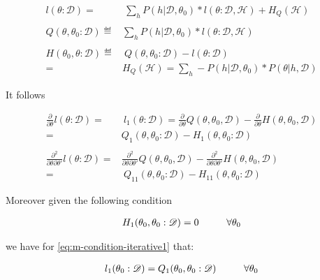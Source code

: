 \documentclass[11pt]{article}
\begin{document}
\begin{align} \label{eq:likelihood_energy_iterative}
l (\theta: \mathscr{D}) =& \  \sum_h P(h | \mathscr{D}, \theta_0) * l (\theta: \mathscr{D}, \mathscr{H}) + H_Q (\mathscr {H}) \\
\nonumber\\
Q(\theta, \theta_0 : \mathscr{D}) \eqdef& \sum_h P(h | \mathscr{D}, \theta_0) * l (\theta: \mathscr{D}, \mathscr{H})\\
\nonumber\\  
H(\theta_0, \theta: \mathscr{D}) \eqdef& \ Q(\theta, \theta_0 : \mathscr{D}) - l (\theta: \mathscr{D}) \\
                                 =& H_Q (\mathscr {H}) = \sum_h - P(h | \mathscr{D}, \theta_0) * P(\theta | h, \mathscr{D}) \nonumber
\end{align}

It follows

\begin{align} 
\frac{\partial}{\partial \theta} l (\theta: \mathscr{D}) =& \ l_1 (\theta: \mathscr{D}) = \frac{\partial}{\partial \theta} Q(\theta, \theta_0, \mathscr{D}) - \frac{\partial}{\partial \theta} H(\theta, \theta_0, \mathscr{D}) \nonumber \\
=& Q_1(\theta, \theta_0 : \mathscr{D}) - H_1(\theta, \theta_0 : \mathscr{D})  \label{eq:m-condition-iterative1} \\
\nonumber \\
\frac{\partial^2}{\partial \theta \partial \theta'} l (\theta: \mathscr{D}) =& \frac{\partial^2}{\partial \theta \partial \theta'}  Q(\theta, \theta_0, \mathscr{D}) -  \frac{\partial^2}{\partial \theta \partial \theta'}  H(\theta, \theta_0, \mathscr{D}) \nonumber \\
  =& \ Q_{11}(\theta, \theta_0 : \mathscr{D}) - H_{11}(\theta, \theta_0 : \mathscr{D}) \label{eq:m-condition-iterative2}
\end{align}

Moreover given the following condition

\begin{align} 
 H_1(\theta_0, \theta_0 : \mathscr{D})  = 0 \hspace*{1cm} \forall \theta_0 \label{eq:m-condition-entropy-iterative} \\
\end{align}

we have for \ref{eq:m-condition-iterative1} that:

\begin{align} 
 l_1(\theta_0: \mathscr{D})  = Q_1(\theta_0, \theta_0: \mathscr{D}) \hspace*{1cm} \forall \theta_0 \label{eq:m-condition-entropy-iterative2} 
\end{align}
\end{document}
